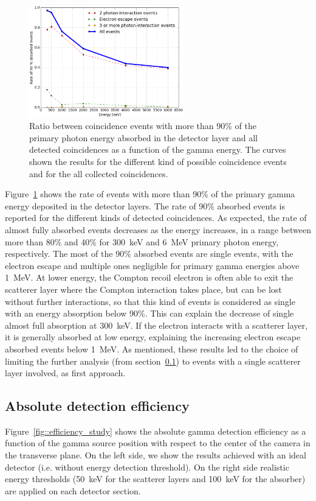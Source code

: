 \begin{figure} [!hbtp]	
\centering
\includegraphics[width=0.6\textwidth]{./Figure/new/90absFracVSenergy_hadronth.png}
\caption{Ratio between coincidence events with more than 90\% of the primary photon energy absorbed in the detector layer and all detected coincidences as a function of the gamma energy. The curves shown the results for the different kind of possible coincidence events and for the all collected coincidences.}
\label{fig::rate_full_abs}
\end{figure}

Figure~\ref{fig::rate_full_abs} shows the rate of events with more than 90\% of the primary gamma energy deposited in the detector layers. The rate of 90\% absorbed events is reported for the different kinds of detected coincidences. As expected, the rate of almost fully absorbed events decreases as the energy increases, in a range between more than 80\% and 40\% for 300~keV and 6~MeV primary photon energy, respectively. The most of the 90\% absorbed events are single events, with the electron escape and multiple ones negligible for primary gamma energies above 1~MeV. At lower energy, the Compton recoil electron is often able to exit the scatterer layer where the Compton interaction takes place, but can be lost without further interactions, so that this kind of events is considered as single with an energy absorption below 90\%. This can explain the decrease of single almost full absorption at 300~keV. If the electron interacts with a scatterer layer, it is generally absorbed at low energy, explaining the increasing electron escape absorbed events below 1~MeV. 
As mentioned, these results led to the choice of limiting the further analysis (from section~\ref{Results::efficiency}) to events with a single scatterer layer involved, as first approach.
 
 \subsection{Absolute detection efficiency}
\label{Results::efficiency}
Figure~\ref{fig::efficiency_study} shows the absolute gamma detection efficiency as a function of the gamma source position with respect to the center of the camera in the transverse plane. On the left side, we show the results achieved with an ideal detector (i.e. without energy detection threshold). On the right side realistic energy thresholds (50~keV for the scatterer layers and 100~keV for the absorber) are applied on each detector section.

